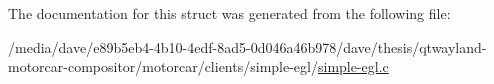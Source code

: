 The documentation for this struct was generated from the following file\-:\begin{DoxyCompactItemize}
\item 
/media/dave/e89b5eb4-\/4b10-\/4edf-\/8ad5-\/0d046a46b978/dave/thesis/qtwayland-\/motorcar-\/compositor/motorcar/clients/simple-\/egl/\hyperlink{simple-egl_8c}{simple-\/egl.\-c}\end{DoxyCompactItemize}
